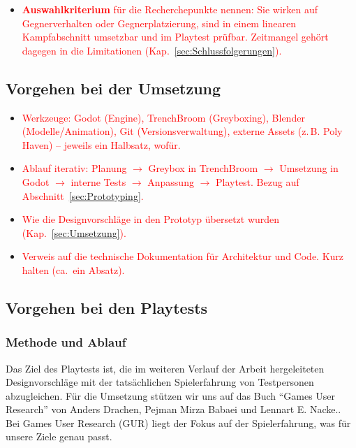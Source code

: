 \documentclass[../Main.tex]{subfiles}
\begin{document}
\begin{itemize}[leftmargin=1.5cm]
    \item \textcolor{red}{\textbf{Auswahlkriterium} für die Recherchepunkte nennen: Sie wirken auf Gegnerverhalten oder Gegnerplatzierung, sind in einem linearen Kampfabschnitt umsetzbar und im Playtest prüfbar. Zeitmangel gehört dagegen in die Limitationen (Kap.~\ref{sec:Schlussfolgerungen}).}
\end{itemize}

\subsection{Vorgehen bei der Umsetzung} \label{sec:VorgehenUmsetzung}

\begin{itemize}[leftmargin=1.5cm]
    \item \textcolor{red}{Werkzeuge: Godot (Engine), TrenchBroom (Greyboxing), Blender (Modelle/Animation), Git (Versionsverwaltung), externe Assets (z.\,B. Poly Haven) -- jeweils ein Halbsatz, wofür.}
    \item \textcolor{red}{Ablauf iterativ: Planung $\rightarrow$ Greybox in TrenchBroom $\rightarrow$ Umsetzung in Godot $\rightarrow$ interne Tests $\rightarrow$ Anpassung $\rightarrow$ Playtest. Bezug auf Abschnitt~\ref{sec:Prototyping}.}
    \item \textcolor{red}{Wie die Designvorschläge in den Prototyp übersetzt wurden (Kap.~\ref{sec:Umsetzung}).}
    \item \textcolor{red}{Verweis auf die technische Dokumentation für Architektur und Code. Kurz halten (ca.\ ein Absatz).}
\end{itemize}

\subsection{Vorgehen bei den Playtests} \label{sec:VorgehenPlaytest}

\subsubsection{Methode und Ablauf} \label{sec:MethodePlaytest}
Das Ziel des Playtests ist, die im weiteren Verlauf der Arbeit hergeleiteten Designvorschläge mit der tatsächlichen Spielerfahrung von Testpersonen abzugleichen. Für die Umsetzung stützen wir uns auf das Buch \enquote{Games User Research} von Anders Drachen, Pejman Mirza Babaei und Lennart E. Nacke.\autocite{drachen2018gamesuserresearch}. Bei Games User Research (GUR) liegt der Fokus auf der Spielerfahrung, was für unsere Ziele genau passt.
\end{document}
